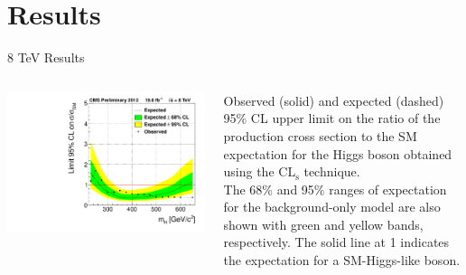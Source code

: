 \section{Results}


\begin{frame}{8 TeV Results}
\begin{center}
\scriptsize
\begin{columns}
\begin{column}{0.6\textwidth}
\includegraphics[width=1.0\textwidth]{images/8TeV_limit.pdf}
\end{column}
\begin{column}{0.4\textwidth}
Observed (solid) and expected (dashed) 95\% CL upper limit on the ratio of the production cross section to the SM expectation for the Higgs boson obtained using the $\mathrm{CL_s}$ technique.\\
\vspace{1em}
The 68\% and 95\% ranges of expectation for the background-only model are also shown with green and yellow bands, respectively.  The solid line at 1 indicates the expectation for a SM-Higgs-like boson.
\end{column}
\end{columns}
\end{center}
\end{frame}


